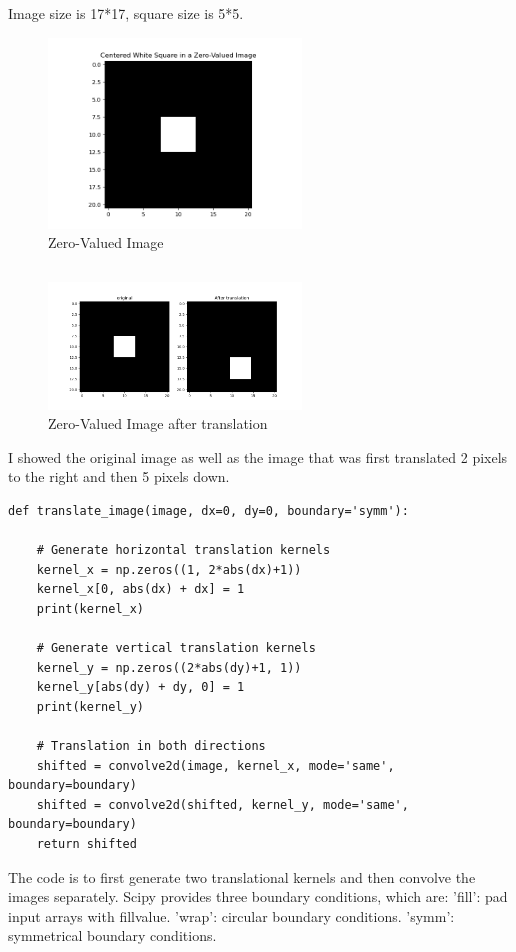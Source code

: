 \documentclass[12pt]{article}
\begin{document}
\subsection{}
Image size is 17*17, square size is 5*5.
\begin{figure}[h]
    \centering
    \includegraphics[width=0.6\textwidth]{pics/a6_1.4.png} 
    \caption{Zero-Valued Image}
\end{figure}
\subsection{}
\begin{figure}[ht]
    \centering
    \includegraphics[width=0.6\textwidth]{pics/a6_1.5.png} 
    \caption{Zero-Valued Image after translation}
\end{figure}
I showed the original image as well as the image that was first translated 2 pixels to the right and then 5 pixels down.
\begin{lstlisting}
def translate_image(image, dx=0, dy=0, boundary='symm'):
    
    # Generate horizontal translation kernels
    kernel_x = np.zeros((1, 2*abs(dx)+1))
    kernel_x[0, abs(dx) + dx] = 1  
    print(kernel_x)
    
    # Generate vertical translation kernels
    kernel_y = np.zeros((2*abs(dy)+1, 1))
    kernel_y[abs(dy) + dy, 0] = 1
    print(kernel_y)
    
    # Translation in both directions
    shifted = convolve2d(image, kernel_x, mode='same', boundary=boundary)
    shifted = convolve2d(shifted, kernel_y, mode='same', boundary=boundary)
    return shifted
\end{lstlisting}
The code is to first generate two translational kernels and then convolve the images separately.
Scipy provides three boundary conditions, which are:
'fill': pad input arrays with fillvalue.
'wrap': circular boundary conditions.
'symm': symmetrical boundary conditions.
\end{document}
